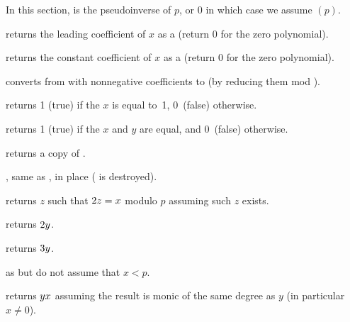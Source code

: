 In this section,  is the pseudoinverse of $p$, or $0$ in which case
we assume $(p)$.

 returns the leading coefficient of $x$ as a
 (return $0$ for the zero polynomial).

 returns the constant coefficient of $x$ as a
 (return $0$ for the zero polynomial).

 converts from  with
nonnegative coefficients to  (by reducing them mod ).

 returns 1 (true) if the  $x$ is equal
to~1, 0~(false) otherwise.

 returns 1 (true) if the  $x$
and $y$ are equal, and 0~(false) otherwise.

 returns a copy of .




, same as , in place
( is destroyed).



 returns $z$ such that $2\*z = x$ modulo
$p$ assuming such $z$ exists.





 returns $2\*y$.

 returns $3\*y$.

 as  but do not
assume that $x<p$.

 returns $y\*x$
assuming the result is monic of the same degree as $y$ (in particular $x\neq
0$).

